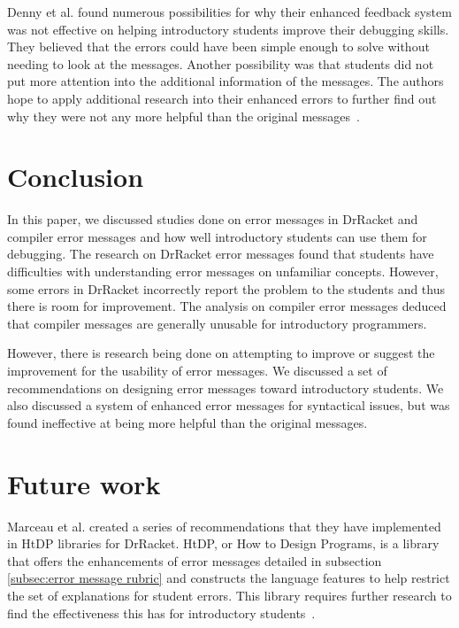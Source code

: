 \documentclass{sig-alternate}
\begin{document}
Denny et al. found numerous possibilities for why their enhanced feedback system was not effective on helping introductory students improve their debugging skills.
They believed that the errors could have been simple enough to solve without needing to look at the messages.
Another possibility was that students did not put more attention into the additional information of the messages.
The authors hope to apply additional research into their enhanced errors to further find out why they were not any more helpful than the original messages~\cite{Denny:2014:ESE:2591708.2591748}.


\section{Conclusion}\label{sec:concl}

In this paper, we discussed studies done on error messages in DrRacket and compiler error messages and how well introductory students can use them for debugging.
The research on DrRacket error messages found that students have difficulties with understanding error messages on unfamiliar concepts.
However, some errors in DrRacket incorrectly report the problem to the students and thus there is room for improvement.
The analysis on compiler error messages deduced that compiler messages are generally unusable for introductory programmers.

However, there is research being done on attempting to improve or suggest the improvement for the usability of error messages.
We discussed a set of recommendations on designing error messages toward introductory students.
We also discussed a system of enhanced error messages for syntactical issues, but was found ineffective at being more helpful than the original messages.

\section{Future work}\label{sec:ftrwrk}

Marceau et al. created a series of recommendations that they have implemented in HtDP libraries for DrRacket.
HtDP, or How to Design Programs, is a library that offers the enhancements of error messages detailed in subsection \ref{subsec:error message rubric} and constructs the language features to help restrict the set of explanations for student errors.
This library requires further research to find the effectiveness this has for introductory students~\cite{htdp-teachpacks}.
\end{document}
